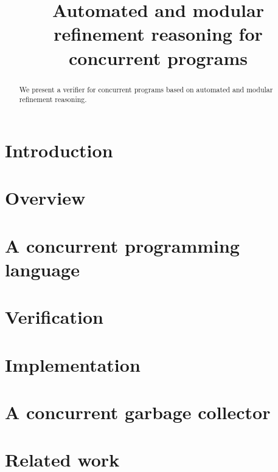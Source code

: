 \documentclass [preprint]{sigplanconf}
\theoremstyle{remark}
\theoremstyle{definition}
\newcommand{\civl}{{\sc civl}\xspace}
\newcommand{\boogie}{{\sc boogie}\xspace}
\newcommand{\zthree}{{\sc Z3}\xspace}
\newcommand{\casm}{{\sc casm}\xspace}
\begin{document}
\setlength{\pdfpageheight}{\paperheight}
\setlength{\pdfpagewidth}{\paperwidth}


\title{Automated and modular refinement reasoning for concurrent programs}
\authorinfo{}{}{}

\maketitle



\begin{abstract}
We present a verifier for concurrent programs based on automated and modular refinement reasoning.  

\end{abstract}

\section{Introduction}
\label{sec:introduction}

\section{Overview}
\label{sec:overview}

\section{A concurrent programming language}
\label{sec:language}

\section{Verification}
\label{sec:verification}

\section{Implementation}
\label{sec:implementation}
\section{A concurrent garbage collector}
\label{sec:gc}


\section{Related work}
\label{sec:related}




\end{document}
